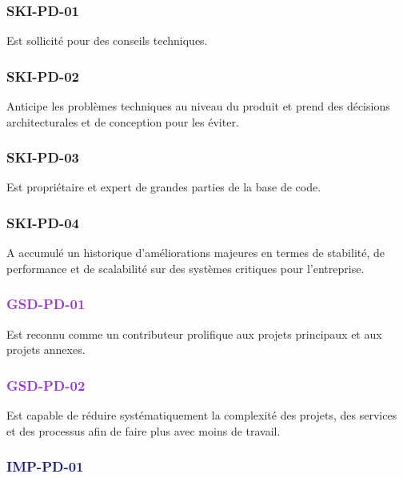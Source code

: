 \documentclass[a4paper, french, openany, 12pt]{book}
\newcommand\dex[1]{\textcolor{BrickRed}{\textbf{\uppercase{ski-{#1}}}}}
\newcommand\str[1]{\textcolor{DarkOrchid}{\textbf{\uppercase{gsd-{#1}}}}}
\newcommand\wis[1]{\textcolor{MidnightBlue}{\textbf{\uppercase{imp-{#1}}}}}
\begin{document}
\begin{multicols}{2}

  \subsubsection*{\dex{pd-01}}

  Est sollicité pour des conseils techniques.
  
  \subsubsection*{\dex{pd-02}}

  Anticipe les problèmes techniques au niveau du produit et prend des décisions architecturales et de conception pour les 
  éviter.

  \subsubsection*{\dex{pd-03}}

  Est propriétaire et expert de grandes parties de la base de code.
  
  \subsubsection*{\dex{pd-04}}

  A accumulé un historique d'améliorations majeures en termes de stabilité, de performance et de scalabilité sur des 
  systèmes critiques pour l'entreprise.

  \subsubsection*{\str{pd-01}}

  Est reconnu comme un contributeur prolifique aux projets principaux et aux projets annexes.

  \subsubsection*{\str{pd-02}}

  Est capable de réduire systématiquement la complexité des projets, des services et des processus afin de faire plus 
  avec moins de travail.

  \subsubsection*{\wis{pd-01}}


\end{multicols}
\end{document}
